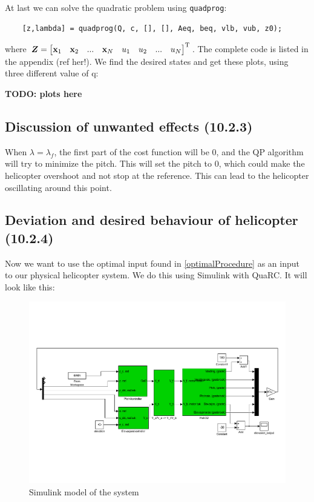 At last we can solve the quadratic problem using \texttt{quadprog}:

\begin{lstlisting}
	[z,lambda] = quadprog(Q, c, [], [], Aeq, beq, vlb, vub, z0);
\end{lstlisting}
where $\bm{Z} = \begin{bmatrix} \mathbf{x}_1 & \mathbf{x}_2 & ... & \mathbf{x}_N & u_1 & u_2 & ... & u_N \end{bmatrix} ^{\text{T}}$. The complete code is listed in the appendix (ref her!). We find the desired states and get these plots, using three different value of q:

\textbf{TODO: plots here} 

\subsection{Discussion of unwanted effects (10.2.3)\label{unwanted}}
When $\lambda = \lambda_f$, the first part of the cost function will be 0, and the QP algorithm will try to minimize the pitch. This will set the pitch to 0, which could make the helicopter overshoot and not stop at the reference. This can lead to the helicopter oscillating around this point.


\subsection{Deviation and desired behaviour of helicopter (10.2.4)}
Now we want to use the optimal input found in \ref{optimalProcedure} as an input to our physical helicopter system. We do this using Simulink with QuaRC. It will look like this:

\begin{figure}[H]
	\centering
	\includegraphics[width=\textwidth, trim=2cm 6cm 2cm 2cm]{simulinkmodels/heldag2}
	\caption{Simulink model of the system}
	\label{fig:heldag2}
\end{figure}

